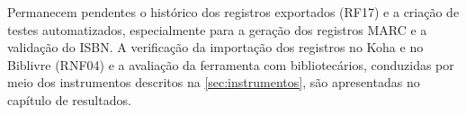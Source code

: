 Permanecem pendentes o histórico dos registros exportados (RF17) e a criação de testes automatizados, especialmente para a geração dos registros MARC e a validação do ISBN. A verificação da importação dos registros no Koha e no Biblivre (RNF04) e a avaliação da ferramenta com bibliotecários, conduzidas por meio dos instrumentos descritos na \autoref{sec:instrumentos}, são apresentadas no capítulo de resultados.
